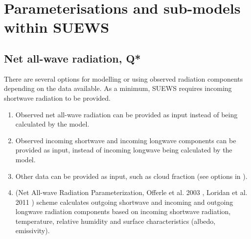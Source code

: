 \documentclass[letterpaper,10pt,english]{sphinxmanual}
\begin{document}
\chapter{Parameterisations and sub-models within SUEWS}
\label{\detokenize{parameterisations-and-sub-models::doc}}\label{\detokenize{parameterisations-and-sub-models:benchmark-system}}\label{\detokenize{parameterisations-and-sub-models:parameterisations-and-sub-models-within-suews}}

\section{Net all-wave radiation, Q*}
\label{\detokenize{parameterisations-and-sub-models:net-all-wave-radiation-q}}
There are several options for modelling or using observed radiation
components depending on the data available. As a minimum, SUEWS requires
incoming shortwave radiation to be provided.
\begin{enumerate}
\item {} 
Observed net all-wave radiation can be provided as input instead of
being calculated by the model.

\item {} 
Observed incoming shortwave and incoming longwave components can be
provided as input, instead of incoming longwave being calculated by
the model.

\item {} 
Other data can be provided as input, such as cloud fraction (see
options in {\hyperref[\detokenize{input_files/RunControl/RunControl:runcontrol-nml}]{}}).

\item {} 
 (Net All-wave Radiation Parameterization, Offerle et al.
2003 \label{\detokenize{parameterisations-and-sub-models:id1}}{\hyperref[\detokenize{references:o2003}]{\sphinxcrossref{{[}O2003{]}}}} , Loridan et al. 2011 \label{\detokenize{parameterisations-and-sub-models:id2}}{\hyperref[\detokenize{references:l2011}]{\sphinxcrossref{{[}L2011{]}}}} ) scheme calculates outgoing
shortwave and incoming and outgoing longwave radiation components
based on incoming shortwave radiation, temperature, relative humidity
and surface characteristics (albedo, emissivity).

\end{enumerate}
\end{document}
